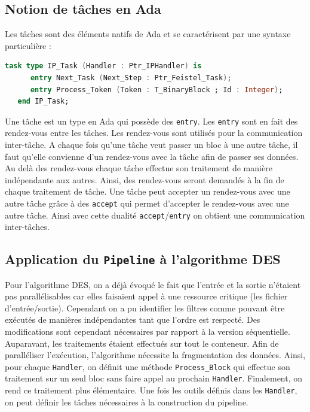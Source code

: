 \documentclass[a4paper]{article}
\begin{document}
\subsection{Notion de tâches en Ada}
Les tâches sont des éléments natifs de Ada et se caractérisent par une syntaxe particulière :
	\begin{lstlisting}[language=ada]
 task type IP_Task (Handler : Ptr_IPHandler) is
      entry Next_Task (Next_Step : Ptr_Feistel_Task);
      entry Process_Token (Token : T_BinaryBlock ; Id : Integer);
   end IP_Task;
	\end{lstlisting}
Une tâche est un type en Ada qui possède des \texttt{entry}. Les \texttt{entry} sont en fait des rendez-vous entre les tâches. Les rendez-vous sont utilisés pour la communication inter-tâche. A chaque fois qu'une tâche veut passer un bloc à une autre tâche, il faut qu'elle convienne d'un rendez-vous avec la tâche afin de passer ses données. Au delà des rendez-vous chaque tâche effectue son traitement de manière indépendante aux autres. Ainsi, des rendez-vous seront demandés à la fin de chaque traitement de tâche.
\smallbreak
Une tâche peut accepter un rendez-vous avec une autre tâche grâce à des \texttt{accept} qui permet d'accepter le rendez-vous avec une autre tâche. Ainsi avec cette dualité \texttt{accept}/\texttt{entry} on obtient une communication inter-tâches.

\subsection{Application du \texttt{Pipeline} à l'algorithme DES}
Pour l'algorithme DES, on a déjà évoqué le fait que l'entrée et la sortie n'étaient pas parallélisables car elles faisaient appel à une ressource critique (les fichier d'entrée/sortie). Cependant on a pu identifier les filtres comme pouvant être exécutés de manières indépendantes tant que l'ordre est respecté.
\smallbreak
Des modifications sont cependant nécessaires par rapport à la version séquentielle. Auparavant, les traitements étaient effectués sur tout le conteneur. Afin de paralléliser l'exécution, l'algorithme nécessite la fragmentation des données. Ainsi, pour chaque \texttt{Handler}, on définit une méthode \texttt{Process\_Block} qui effectue son traitement sur un seul bloc sans faire appel au prochain \texttt{Handler}. Finalement, on rend ce traitement plus élémentaire.
\smallbreak
Une fois les outils définis dans les \texttt{Handler}, on peut définir les tâches nécessaires à la construction du pipeline.
\end{document}
